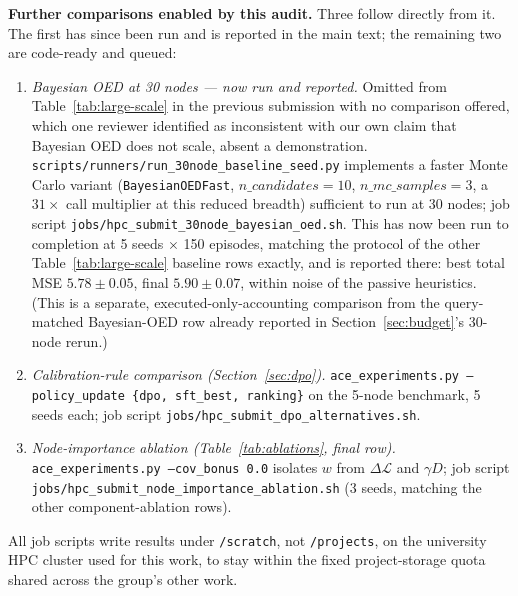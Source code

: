 \documentclass[twoside]{article}
\theoremstyle{plain}
\theoremstyle{definition}
\theoremstyle{remark}
\begin{document}
\textbf{Further comparisons enabled by this audit.} Three follow directly from it. The first has since been run and is reported in the main text; the remaining two are code-ready and queued:
\begin{enumerate}[leftmargin=1.5em,topsep=0.2em,itemsep=0.1em]
\item \emph{Bayesian OED at 30 nodes --- now run and reported.} Omitted from Table~\ref{tab:large-scale} in the previous submission with no comparison offered, which one reviewer identified as inconsistent with our own claim that Bayesian OED does not scale, absent a demonstration. \texttt{scripts/runners/run\_30node\_baseline\_seed.py} implements a faster Monte Carlo variant (\texttt{BayesianOEDFast}, $n\_candidates{=}10$, $n\_mc\_samples{=}3$, a $31\times$ call multiplier at this reduced breadth) sufficient to run at 30 nodes; job script \texttt{jobs/hpc\_submit\_30node\_bayesian\_oed.sh}. This has now been run to completion at 5 seeds $\times$ 150 episodes, matching the protocol of the other Table~\ref{tab:large-scale} baseline rows exactly, and is reported there: best total MSE $5.78\pm0.05$, final $5.90\pm0.07$, within noise of the passive heuristics. (This is a separate, executed-only-accounting comparison from the query-matched Bayesian-OED row already reported in Section~\ref{sec:budget}'s 30-node rerun.)
\item \emph{Calibration-rule comparison (Section~\ref{sec:dpo}).} \texttt{ace\_experiments.py --policy\_update \{dpo, sft\_best, ranking\}} on the 5-node benchmark, 5 seeds each; job script \texttt{jobs/hpc\_submit\_dpo\_alternatives.sh}.
\item \emph{Node-importance ablation (Table~\ref{tab:ablations}, final row).} \texttt{ace\_experiments.py --cov\_bonus 0.0} isolates $w$ from $\Delta\mathcal L$ and $\gamma D$; job script \texttt{jobs/hpc\_submit\_node\_importance\_ablation.sh} (3 seeds, matching the other component-ablation rows).
\end{enumerate}
All job scripts write results under \texttt{/scratch}, not \texttt{/projects}, on the university HPC cluster used for this work, to stay within the fixed project-storage quota shared across the group's other work.
\end{document}
